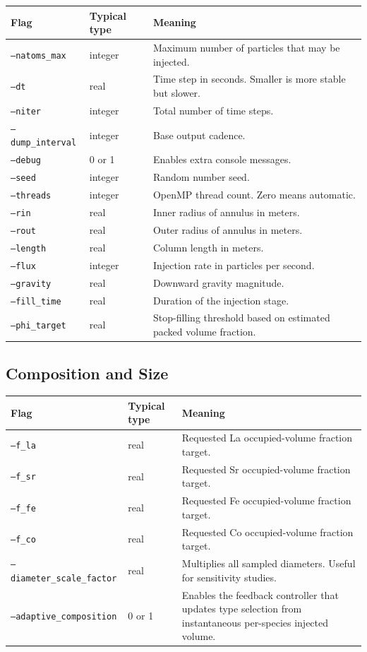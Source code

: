 \documentclass[11pt]{article}
\begin{document}
\begin{longtable}{p{}p{}p{}}
\toprule
\textbf{Flag} & \textbf{Typical type} & \textbf{Meaning} \\
\midrule
\endhead
\texttt{--natoms\_max} & integer & Maximum number of particles that may be injected. \\
\texttt{--dt} & real & Time step in seconds. Smaller is more stable but slower. \\
\texttt{--niter} & integer & Total number of time steps. \\
\texttt{--dump\_interval} & integer & Base output cadence. \\
\texttt{--debug} & 0 or 1 & Enables extra console messages. \\
\texttt{--seed} & integer & Random number seed. \\
\texttt{--threads} & integer & OpenMP thread count. Zero means automatic. \\
\texttt{--rin} & real & Inner radius of annulus in meters. \\
\texttt{--rout} & real & Outer radius of annulus in meters. \\
\texttt{--length} & real & Column length in meters. \\
\texttt{--flux} & integer & Injection rate in particles per second. \\
\texttt{--gravity} & real & Downward gravity magnitude. \\
\texttt{--fill\_time} & real & Duration of the injection stage. \\
\texttt{--phi\_target} & real & Stop-filling threshold based on estimated packed volume fraction. \\
\bottomrule
\end{longtable}

\subsection{Composition and Size}

\begin{longtable}{p{}p{}p{}}
\toprule
\textbf{Flag} & \textbf{Typical type} & \textbf{Meaning} \\
\midrule
\endhead
\texttt{--f\_la} & real & Requested La occupied-volume fraction target. \\
\texttt{--f\_sr} & real & Requested Sr occupied-volume fraction target. \\
\texttt{--f\_fe} & real & Requested Fe occupied-volume fraction target. \\
\texttt{--f\_co} & real & Requested Co occupied-volume fraction target. \\
\texttt{--diameter\_scale\_factor} & real & Multiplies all sampled diameters. Useful for sensitivity studies. \\
\texttt{--adaptive\_composition} & 0 or 1 & Enables the feedback controller that updates type selection from instantaneous per-species injected volume. \\
\bottomrule
\end{longtable}
\end{document}
